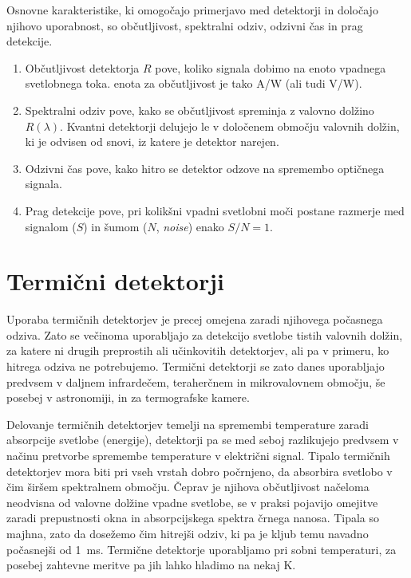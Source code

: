 Osnovne karakteristike, ki omogočajo primerjavo med detektorji in določajo njihovo uporabnost,
so občutljivost, spektralni odziv, odzivni čas in prag detekcije. 

\begin{enumerate}
\item Občutljivost detektorja $R$ pove, koliko signala dobimo na enoto vpadnega svetlobnega toka. 
enota za občutljivost je tako A/W (ali tudi V/W). 
\item Spektralni odziv pove, kako se občutljivost spreminja z valovno dolžino $R(\lambda)$. 
Kvantni detektorji delujejo le v določenem območju valovnih dolžin, ki je odvisen od snovi, 
iz katere je detektor narejen. 
\item Odzivni čas pove, kako hitro se detektor odzove na spremembo optičnega signala. 
\item Prag detekcije pove, pri kolikšni vpadni svetlobni moči postane razmerje med signalom ($S$)
in šumom ($N$, {\it noise}) enako $S/N = 1$. 
\end{enumerate}

\section{Termični detektorji}
Uporaba termičnih detektorjev je precej omejena zaradi njihovega počasnega odziva. Zato
se večinoma uporabljajo za detekcijo svetlobe tistih valovnih dolžin, za katere ni drugih
preprostih ali učinkovitih detektorjev, ali pa v primeru, ko hitrega odziva ne potrebujemo.
Termični detektorji se zato danes uporabljajo predvsem v daljnem infrardečem, teraherčnem 
in mikrovalovnem območju, še posebej v astronomiji, in za termografske kamere.

Delovanje termičnih detektorjev temelji na spremembi temperature zaradi absorpcije svetlobe 
(energije), detektorji pa se med seboj razlikujejo predvsem v načinu pretvorbe spremembe 
temperature v električni signal.
Tipalo termičnih detektorjev mora biti pri vseh vrstah dobro počrnjeno, da absorbira
svetlobo v čim širšem spektralnem območju. Čeprav je njihova občutljivost načeloma 
neodvisna od valovne dolžine vpadne svetlobe, se v praksi pojavijo omejitve zaradi
prepustnosti okna in absorpcijskega spektra črnega nanosa. Tipala so majhna, zato 
da dosežemo čim hitrejši odziv, ki pa je kljub temu navadno počasnejši od 1~ms. 
Termične detektorje uporabljamo pri sobni temperaturi, za posebej zahtevne meritve pa 
jih lahko hladimo na nekaj K. 

